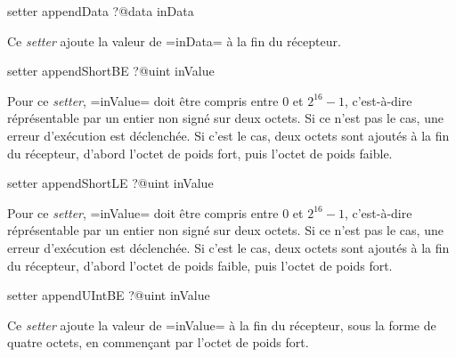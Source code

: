 
\begin{galgas}
setter appendData ?@data inData
\end{galgas}

Ce \emph{setter} ajoute la valeur de \ggs=inData= à la fin du récepteur.






\begin{galgas}
setter appendShortBE ?@uint inValue
\end{galgas}

Pour ce \emph{setter}, \ggs=inValue= doit être compris entre $0$ et $2^{16}-1$, c'est-à-dire réprésentable par un entier non signé sur deux octets. Si ce n'est pas le cas, une erreur d'exécution est déclenchée. Si c'est le cas, deux octets sont ajoutés à la fin du récepteur, d'abord l'octet de poids fort, puis l'octet de poids faible.








\begin{galgas}
setter appendShortLE ?@uint inValue
\end{galgas}

Pour ce \emph{setter}, \ggs=inValue= doit être compris entre $0$ et $2^{16}-1$, c'est-à-dire réprésentable par un entier non signé sur deux octets. Si ce n'est pas le cas, une erreur d'exécution est déclenchée. Si c'est le cas, deux octets sont ajoutés à la fin du récepteur, d'abord l'octet de poids faible, puis l'octet de poids fort.









\begin{galgas}
setter appendUIntBE ?@uint inValue
\end{galgas}

Ce \emph{setter} ajoute la valeur de \ggs=inValue= à la fin du récepteur, sous la forme de quatre octets, en commençant par l'octet de poids fort.









